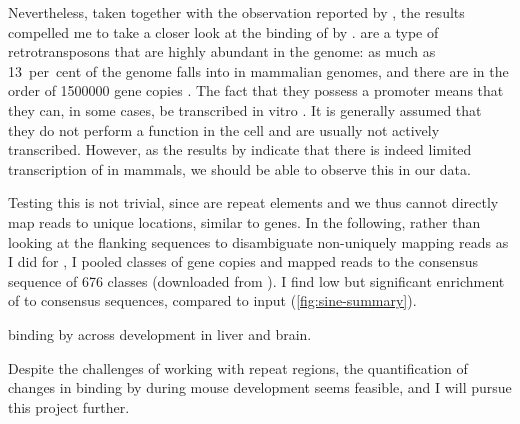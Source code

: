 Nevertheless, taken together with the observation reported by
\citet{Carriere:2012}, the results compelled me to take a closer look at the
binding of \transsine by . \transsine are a type of retrotransposons that
are highly abundant in the genome: as much as \SI{13}{per cent} of the genome
falls into \transsine[s] in mammalian genomes, and there are in the order of
\num{1500000} gene copies \citep{Lander:2001}. The fact that they possess a
 promoter means that they can, in some cases, be transcribed in vitro
\citep{White:1998}. It is generally assumed that they do not perform a function
in the cell and are usually not actively transcribed. However, as the results by
\citet{Carriere:2012} indicate that there is indeed limited transcription of
\transsine in mammals, we should be able to observe this in our  \chip
data.

Testing this is not trivial, since \transsine[s] are repeat elements and we thus
cannot directly map reads to unique locations, similar to \trna genes. In the
following, rather than looking at the flanking sequences to disambiguate
non-uniquely mapping reads as I did for \trna, I pooled classes of \transsine
gene copies and mapped  \chipseq reads to the consensus sequence of
\num{676} classes (downloaded from  \citep{Jurka:2005}). I find
low but significant enrichment of  to \transsine consensus sequences,
compared to input (\cref{fig:sine-summary}).

{ binding by  across development in liver and brain.}{}

Despite the challenges of working with repeat regions, the quantification of
changes in \transsine binding by  during mouse development seems feasible,
and I will pursue this project further.
